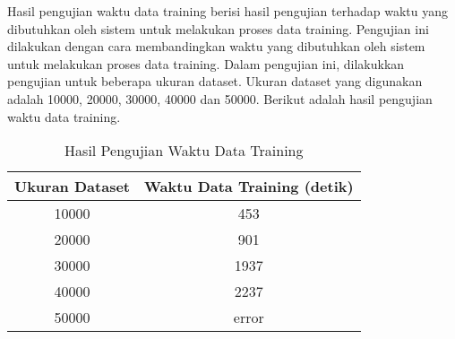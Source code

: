 Hasil pengujian waktu data training berisi hasil pengujian terhadap waktu yang dibutuhkan oleh sistem untuk melakukan proses data training. Pengujian ini dilakukan dengan cara membandingkan waktu yang dibutuhkan oleh sistem untuk melakukan proses data training.
Dalam pengujian ini, dilakukkan pengujian untuk beberapa ukuran dataset. Ukuran dataset yang digunakan adalah 10000, 20000, 30000, 40000 dan 50000. 
Berikut adalah hasil pengujian waktu data training.

\begin{table}[H]
    \caption{Hasil Pengujian Waktu Data Training}
    \centering
    \begin{tabular}{|c|c|}
    \hline
    \textbf{Ukuran Dataset} & \textbf{Waktu Data Training (detik)} \\
    \hline
    10000 & 453 \\
    \hline
    20000 & 901 \\
    \hline
    30000 & 1937 \\
    \hline
    40000 & 2237 \\
    \hline
    50000 & error \\
    \hline
    \end{tabular}
    \label{table:1}
\end{table}